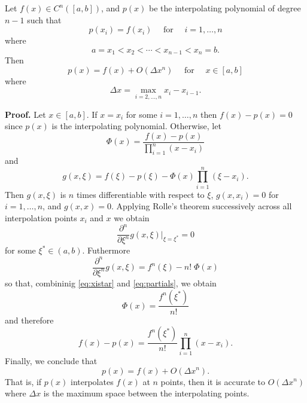 \documentclass{article}
\newcommand{\for}[0]{\quad \text{ for } \quad}
\numberwithin{equation}{section}
\begin{document}
Let $f(x) \in C^{n}([a,b])$, and $p(x)$ be the interpolating
polynomial of degree $n-1$ such that
\begin{equation}
  p(x_i) = f(x_i) \for i=1,\ldots,n
\end{equation}
where
\begin{equation}
  a = x_1 < x_2 < \cdots < x_{n-1} < x_n = b.
\end{equation}
Then
\begin{equation}
  p(x) = f(x) + O(\Delta x^n) \for x \in [a,b]
\end{equation}
where
\begin{equation}
  \Delta x = \max_{i=2,\ldots,n} x_i - x_{i-1}.
\end{equation}

\textbf{Proof.}  Let $x \in [a,b]$.  If $x = x_i$ for some
$i=1,\ldots,n$ then $f(x) - p(x) = 0$ since $p(x)$ is the
interpolating polynomial.  Otherwise, let
\begin{equation}
  \Phi(x) = \frac{f(x) - p(x)}{\prod_{i=1}^n (x - x_i)}
\end{equation}
and
\begin{equation}
  g(x,\xi) = f(\xi) - p(\xi) - \Phi(x) \prod_{i=1}^n (\xi - x_i).
\end{equation}
Then $g(x,\xi)$ is $n$ times differentiable with respect to $\xi$,
$g(x,x_i) = 0$ for $i=1,\ldots,n$, and $g(x,x) = 0$.  Applying Rolle's
theorem successively across all interpolation points $x_i$ and $x$ we
obtain
\begin{equation}
  \label{eq:xistar}
  \frac{\partial^n}{\partial \xi^n} g(x,\xi)\biggr|_{\xi=\xi^*} = 0
\end{equation}
for some $\xi^* \in (a,b)$.  Futhermore
\begin{equation}
  \label{eq:partials}
  \frac{\partial^n}{\partial \xi^n} g(x,\xi) = f^n(\xi) - n!\;\Phi(x)
\end{equation}
so that, combininig \eqref{eq:xistar} and \eqref{eq:partials}, we obtain
\begin{equation}
  \Phi(x) = \frac{f^n(\xi^*)}{n!}
\end{equation}
and therefore
\begin{equation}
  f(x) - p(x) = \frac{f^n(\xi^*)}{n!} \prod_{i=1}^n (x - x_i).
\end{equation}
Finally, we conclude that
\begin{equation}
  p(x) = f(x) + O(\Delta x^n).
\end{equation}
That is, if $p(x)$ interpolates $f(x)$ at $n$ points, then it is
accurate to $O(\Delta x^n)$ where $\Delta x$ is the maximum space
between the interpolating points.
\end{document}
